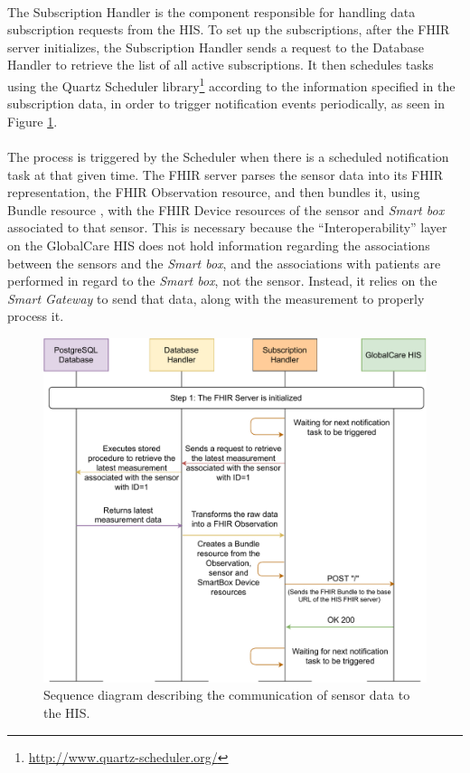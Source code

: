 \paragraph{} The Subscription Handler is the component responsible for handling data subscription requests from the \acs{HIS}. To set up the subscriptions, after the \acs{FHIR} server initializes, the Subscription Handler sends a request to the Database Handler to retrieve the list of all active subscriptions. It then schedules tasks using the Quartz Scheduler library\footnote{\url{http://www.quartz-scheduler.org/}} according to the information specified in the subscription data, in order to trigger notification events periodically, as seen in Figure \ref{fig:fhir-post-bundle}. 

\paragraph{} The process is triggered by the Scheduler when there is a scheduled notification task at that given time. The \acs{FHIR} server parses the sensor data into its \acs{FHIR} representation, the \acs{FHIR} Observation resource, and then bundles it, using Bundle resource \cite{fhir}, with the \acs{FHIR} Device resources of the sensor and \textit{Smart box} associated to that sensor. This is necessary because the ``Interoperability'' layer on the GlobalCare \acs{HIS} does not hold information regarding the associations between the sensors and the \textit{Smart box}, and the associations with patients are performed in regard to the \textit{Smart box}, not the sensor. Instead, it relies on the \textit{Smart Gateway} to send that data, along with the measurement to properly process it. 

\clearpage

\begin{figure}[H]
    \centering
    \includegraphics[width=\linewidth]{images/fhir post bundle.pdf}
    \caption[Sequence diagram describing the communication of sensor data to the \acs{HIS}.]{Sequence diagram describing the communication of sensor data to the \acs{HIS}.}
    \label{fig:fhir-post-bundle}
\end{figure} 

